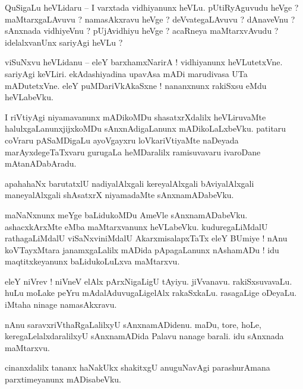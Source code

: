 \documentclass{article}
\begin{document}
\begin{mn}%
QuSigaLu heVLidaru -- I varxtada vidhiyanunx heVLu. pUtiRyAguvudu heVge ? maMtarxgaLAvuvu ? 
namasAkxravu heVge ? deVvategaLAvuvu ? dAnaveVnu ? sAnxnada vidhiyeVnu ? pUjAvidhiyu heVge ? 
acaRneya maMtarxvAvudu ? idelalxvanUnx sariyAgi heVLu ?
\end{mn}

\begin{mn}%
viSuNxvu heVLidanu -- eleY barxhamxNarirA ! vidhiyanunx heVLutetxVne. sariyAgi keVLiri. 
ekAdashiyadina upavAsa mADi marudivasa UTa mADutetxVne. eleY puMDariVkAkaSxne ! nananxnunx 
rakiSxsu eMdu heVLabeVku.
\end{mn}

\begin{mn}%
I riVtiyAgi niyamavanunx mADikoMDu shasatxrXdalilx heVLiruvaMte halulxgaLanunxjijxkoMDu 
sAnxnAdigaLanunx mADikoLaLxbeVku. patitaru coVraru pASaMDigaLu ayoVgayxru loVkariVtiyaMte naDeyada 
marAyxdegeTaTxvaru gurugaLa heMDaralilx ramisuvavaru ivaroDane mAtanADabAradu.
\end{mn}

\begin{mn}%
apahahaNx barutatxlU nadiyalAlxgali kereyalAlxgali bAviyalAlxgali maneyalAlxgali shAsatxrX 
niyamadaMte sAnxnamADabeVku.
\end{mn}

\begin{mn}%
maNaNxnunx meYge baLidukoMDu AmeVle sAnxnamADabeVku. ashacxkArxMte eMba maMtarxvanunx heVLabeVku. 
kuduregaLiMdalU rathagaLiMdalU viSaNxviniMdalU AkarxmisalapxTaTx eleY BUmiye ! nAnu koVTayxMtara 
janamxgaLalilx mADida pApagaLanunx nAshamADu ! idu maqtitxkeyanunx baLidukoLuLxva maMtarxvu.
\end{mn}

\begin{mn}%
eleY niVrev ! niVneV elAlx pArxNigaLigU tAyiyu. jiVvanavu. rakiSxsuvavaLu. huLu moLake peYru 
mAdalAduvugaLigelAlx rakaSxkaLu. rasagaLige oDeyaLu. iMtaha ninage namasAkxravu.
\end{mn}

\begin{mn}%
nAnu saravxriVthaRgaLalilxyU sAnxnamADidenu. maDu, tore, hoLe, keregaLelalxdaralilxyU sAnxnamADida 
Palavu nanage barali. idu sAnxnada maMtarxvu.
\end{mn}

\begin{mn}%
cinanxdalilx tananx haNakUkx shakitxgU anuguNavAgi parashurAmana parxtimeyanunx mADisabeVku.
\end{mn}
\end{document}
